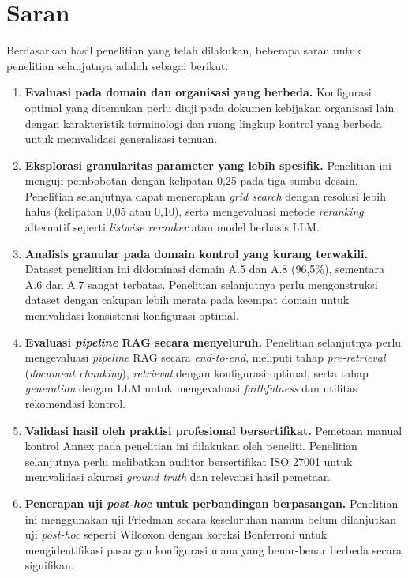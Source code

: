 \section{Saran}

Berdasarkan hasil penelitian yang telah dilakukan, beberapa saran untuk penelitian selanjutnya adalah sebagai berikut.

\begin{enumerate}
	\item \textbf{Evaluasi pada domain dan organisasi yang berbeda.} Konfigurasi optimal yang ditemukan perlu diuji pada dokumen kebijakan organisasi lain dengan karakteristik terminologi dan ruang lingkup kontrol yang berbeda untuk memvalidasi generalisasi temuan.

	\item \textbf{Eksplorasi granularitas parameter yang lebih spesifik.} Penelitian ini menguji pembobotan dengan kelipatan 0,25 pada tiga sumbu desain. Penelitian selanjutnya dapat menerapkan \textit{grid search} dengan resolusi lebih halus (kelipatan 0,05 atau 0,10), serta mengevaluasi metode \textit{reranking} alternatif seperti \textit{listwise reranker} atau model berbasis LLM.

	\item \textbf{Analisis granular pada domain kontrol yang kurang terwakili.} Dataset penelitian ini didominasi domain A.5 dan A.8 (96,5\%), sementara A.6 dan A.7 sangat terbatas. Penelitian selanjutnya perlu mengonstruksi dataset dengan cakupan lebih merata pada keempat domain untuk memvalidasi konsistensi konfigurasi optimal.

	\item \textbf{Evaluasi \textit{pipeline} RAG secara menyeluruh.} Penelitian selanjutnya perlu mengevaluasi \textit{pipeline} RAG secara \textit{end-to-end}, meliputi tahap \textit{pre-retrieval} (\textit{document chunking}), \textit{retrieval} dengan konfigurasi optimal, serta tahap \textit{generation} dengan LLM untuk mengevaluasi \textit{faithfulness} dan utilitas rekomendasi kontrol.

	\item \textbf{Validasi hasil oleh praktisi profesional bersertifikat.} Pemetaan manual kontrol Annex pada penelitian ini dilakukan oleh peneliti. Penelitian selanjutnya perlu melibatkan auditor bersertifikat ISO 27001 untuk memvalidasi akurasi \textit{ground truth} dan relevansi hasil pemetaan.

	\item \textbf{Penerapan uji \textit{post-hoc} untuk perbandingan berpasangan.} Penelitian ini menggunakan uji Friedman secara keseluruhan namun belum dilanjutkan uji \textit{post-hoc} seperti Wilcoxon dengan koreksi Bonferroni untuk mengidentifikasi pasangan konfigurasi mana yang benar-benar berbeda secara signifikan.


\end{enumerate}
